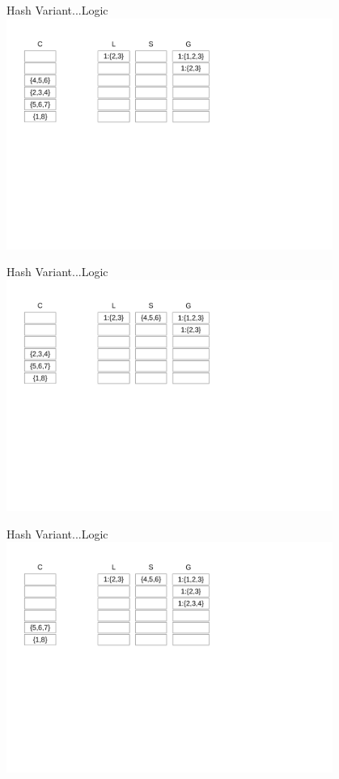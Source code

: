 \documentclass{beamer}
\begin{document}
\begin{frame}{Hash Variant...}{Logic}
    \centering
    \includegraphics[trim={1cm 10cm 11cm 1cm}, clip,width=0.8\textwidth]{figures/L3} 
\end{frame}
\begin{frame}{Hash Variant...}{Logic}
    \centering
    \includegraphics[trim={1cm 10cm 11cm 1cm}, clip,width=0.8\textwidth]{figures/L4} 
\end{frame}
\begin{frame}{Hash Variant...}{Logic}
    \centering
    \includegraphics[trim={1cm 10cm 11cm 1cm}, clip,width=0.8\textwidth]{figures/L5} 
\end{frame}
\end{document}
